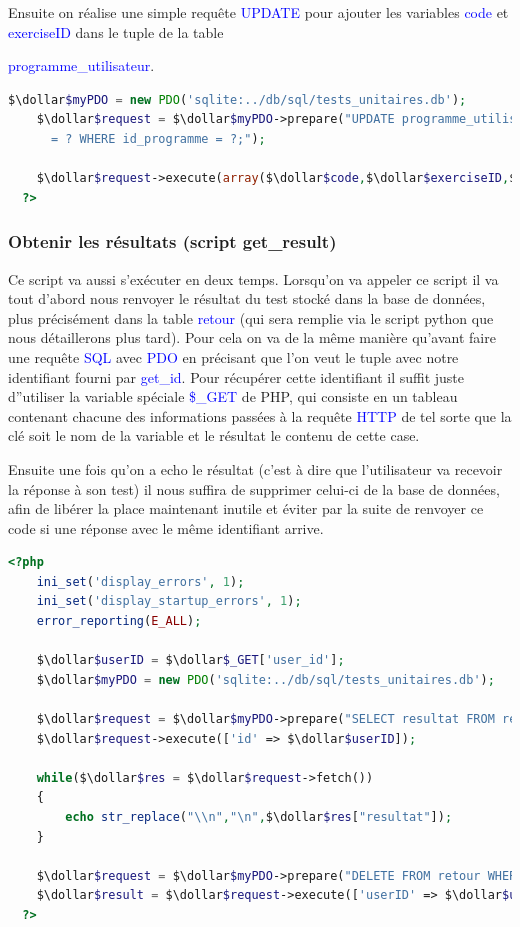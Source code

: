 \documentclass[a4paper]{article}
\renewcommand{\texttt}[2][blue]{\textcolor{#1}{\ttfamily #2}}
\newcommand{\dollar}{\mbox{\textdollar}}
\begin{document}
Ensuite on réalise une simple requête \texttt{UPDATE} pour ajouter les
variables \texttt{code} et \texttt{exerciseID} dans le tuple de la table

\texttt{programme\_utilisateur}.

\begin{lstlisting}[language=PHP]
    $\dollar$myPDO = new PDO('sqlite:../db/sql/tests_unitaires.db');
    $\dollar$request = $\dollar$myPDO->prepare("UPDATE programme_utilisateur SET code = ?, test
      = ? WHERE id_programme = ?;");

    $\dollar$request->execute(array($\dollar$code,$\dollar$exerciseID,$\dollar$userID));
  ?>
\end{lstlisting}

\subsubsection{Obtenir les résultats (script get\_result)}
\label{sub:get-result}

Ce script va aussi s'exécuter en deux temps. Lorsqu'on va appeler ce script il
va tout d'abord nous renvoyer le résultat du test stocké dans la base de
données, plus précisément dans la table \texttt{retour} (qui sera remplie via le
script python que nous détaillerons plus tard). Pour cela on va de la même
manière qu'avant faire une requête \texttt{SQL} avec \texttt{PDO} en précisant
que l'on veut le tuple avec notre identifiant fourni par \texttt{get\_id}.
Pour récupérer cette identifiant il suffit juste d''utiliser la variable
spéciale \texttt{\$\_GET} de PHP, qui consiste en un tableau contenant chacune
des informations passées à la requête \texttt{HTTP} de tel sorte que la clé soit
le nom de la variable et le résultat le contenu de cette case.

Ensuite une fois qu'on a echo le résultat (c'est à dire que l'utilisateur va
recevoir la réponse à son test) il nous suffira de supprimer celui-ci de la
base de données, afin de libérer la place maintenant inutile et éviter par la
suite de renvoyer ce code si une réponse avec le même identifiant arrive.

\begin{lstlisting}[language=PHP]
  <?php
    ini_set('display_errors', 1);
    ini_set('display_startup_errors', 1);
    error_reporting(E_ALL);

    $\dollar$userID = $\dollar$_GET['user_id'];
    $\dollar$myPDO = new PDO('sqlite:../db/sql/tests_unitaires.db');

    $\dollar$request = $\dollar$myPDO->prepare("SELECT resultat FROM retour WHERE id_utilisateur = :id");
    $\dollar$request->execute(['id' => $\dollar$userID]);

    while($\dollar$res = $\dollar$request->fetch())
    {
        echo str_replace("\\n","\n",$\dollar$res["resultat"]);
    }

    $\dollar$request = $\dollar$myPDO->prepare("DELETE FROM retour WHERE id_utilisateur = :userID;");
    $\dollar$result = $\dollar$request->execute(['userID' => $\dollar$userID]);
  ?>
\end{lstlisting}
\end{document}
